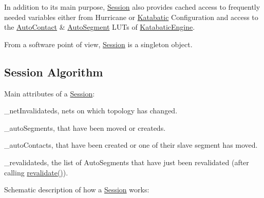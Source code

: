 In addition to it\textquotesingle{}s main purpose, \hyperlink{classKatabatic_1_1Session}{Session} also provides cached access to frequently needed variables either from Hurricane or \hyperlink{namespaceKatabatic}{Katabatic} Configuration and access to the \hyperlink{classKatabatic_1_1AutoContact}{Auto\+Contact} \& \hyperlink{classKatabatic_1_1AutoSegment}{Auto\+Segment} L\+U\+Ts of \hyperlink{classKatabatic_1_1KatabaticEngine}{Katabatic\+Engine}.

From a software point of view, \hyperlink{classKatabatic_1_1Session}{Session} is a singleton object.\hypertarget{classKatabatic_1_1Session_secSessionAlgo}{}\subsection{Session Algorithm}\label{classKatabatic_1_1Session_secSessionAlgo}
Main attributes of a \hyperlink{classKatabatic_1_1Session}{Session}\+:
\begin{DoxyItemize}
\item {\ttfamily \+\_\+net\+Invalidateds}, nets on which topology has changed.
\item {\ttfamily \+\_\+auto\+Segments}, that have been moved or createds.
\item {\ttfamily \+\_\+auto\+Contacts}, that have been created or one of their slave segment has moved.
\item {\ttfamily \+\_\+revalidateds}, the list of Auto\+Segments that have just been revalidated (after calling {\ttfamily \hyperlink{classKatabatic_1_1Session_a4da9e28432c1fdb0c754717487d9cc83}{revalidate()}}).
\end{DoxyItemize}

Schematic description of how a \hyperlink{classKatabatic_1_1Session}{Session} works\+:


